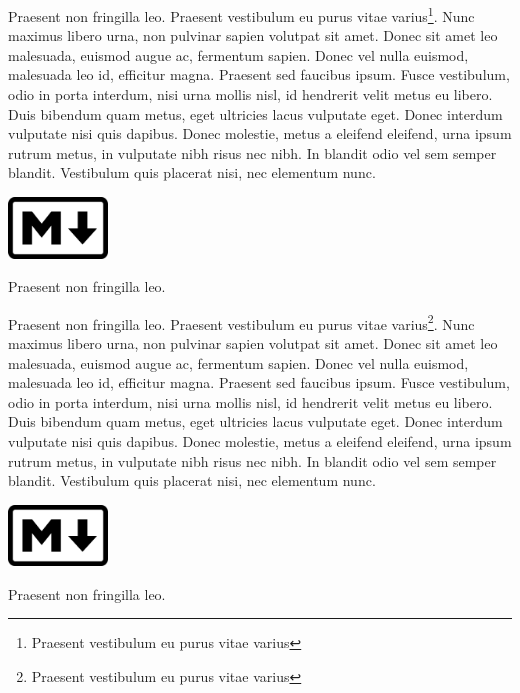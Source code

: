 \documentclass[
]{book}
\newenvironment{env-34a74b75-4401-4593-a64a-6936d97f8740}
{
    \tcolorbox[blanker,left=5pt,borderline west={2pt}{-4pt}{red}]
}
{
    \endtcolorbox
}
\newenvironment{env-35a73417-3913-4c76-87f4-077fd5f4ea4f}
{
    \tcolorbox[blanker,left=5pt,borderline west={2pt}{-4pt}{red}]
}
{
    \endtcolorbox
}
\begin{document}
\begin{env-34a74b75-4401-4593-a64a-6936d97f8740}

Praesent non fringilla leo. Praesent vestibulum eu purus vitae
varius\footnote{Praesent vestibulum eu purus vitae varius}. Nunc maximus
libero urna, non pulvinar sapien volutpat sit amet. Donec sit amet leo
malesuada, euismod augue ac, fermentum sapien. Donec vel nulla euismod,
malesuada leo id, efficitur magna. Praesent sed faucibus ipsum. Fusce
vestibulum, odio in porta interdum, nisi urna mollis nisl, id hendrerit
velit metus eu libero. Duis bibendum quam metus, eget ultricies lacus
vulputate eget. Donec interdum vulputate nisi quis dapibus. Donec
molestie, metus a eleifend eleifend, urna ipsum rutrum metus, in
vulputate nibh risus nec nibh. In blandit odio vel sem semper blandit.
Vestibulum quis placerat nisi, nec elementum nunc.


\includegraphics[width=1.04167in,height=\textheight]{Markdown-mark.svg.png}

Praesent non fringilla leo.

\end{env-34a74b75-4401-4593-a64a-6936d97f8740}

\begin{env-35a73417-3913-4c76-87f4-077fd5f4ea4f}

Praesent non fringilla leo. Praesent vestibulum eu purus vitae
varius\footnote{Praesent vestibulum eu purus vitae varius}. Nunc maximus
libero urna, non pulvinar sapien volutpat sit amet. Donec sit amet leo
malesuada, euismod augue ac, fermentum sapien. Donec vel nulla euismod,
malesuada leo id, efficitur magna. Praesent sed faucibus ipsum. Fusce
vestibulum, odio in porta interdum, nisi urna mollis nisl, id hendrerit
velit metus eu libero. Duis bibendum quam metus, eget ultricies lacus
vulputate eget. Donec interdum vulputate nisi quis dapibus. Donec
molestie, metus a eleifend eleifend, urna ipsum rutrum metus, in
vulputate nibh risus nec nibh. In blandit odio vel sem semper blandit.
Vestibulum quis placerat nisi, nec elementum nunc.


\includegraphics[width=1.04167in,height=\textheight]{Markdown-mark.svg.png}

Praesent non fringilla leo.

\end{env-35a73417-3913-4c76-87f4-077fd5f4ea4f}
\end{document}
